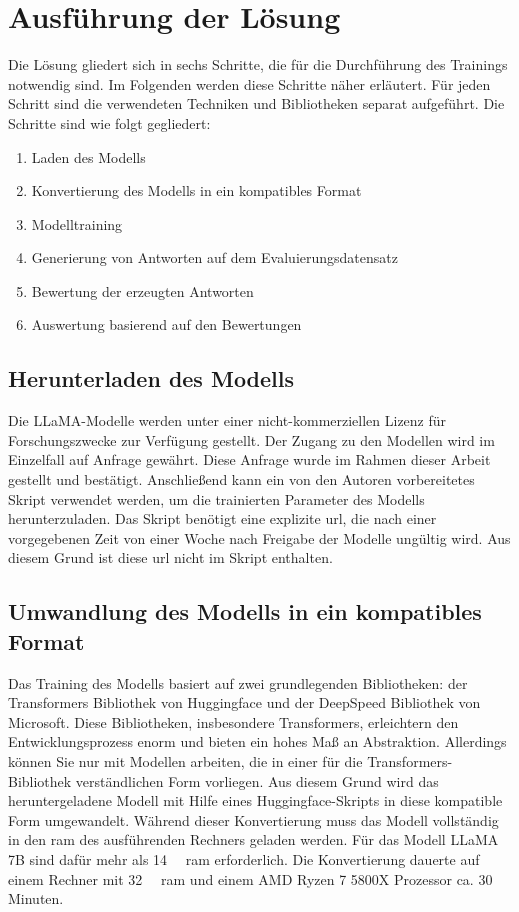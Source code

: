 \chapter{Ausführung der Lösung}\label{ch:solution}

Die Lösung gliedert sich in sechs Schritte, die für die Durchführung des Trainings notwendig sind.
Im Folgenden werden diese Schritte näher erläutert. Für jeden Schritt sind die verwendeten Techniken und Bibliotheken separat aufgeführt.
Die Schritte sind wie folgt gegliedert:
\begin{enumerate}
    \item Laden des Modells
    \item Konvertierung des Modells in ein kompatibles Format
    \item Modelltraining
    \item Generierung von Antworten auf dem Evaluierungsdatensatz
    \item Bewertung der erzeugten Antworten
    \item Auswertung basierend auf den Bewertungen
\end{enumerate}

\section{Herunterladen des Modells}
Die LLaMA-Modelle werden unter einer nicht-kommerziellen Lizenz für Forschungszwecke zur Verfügung gestellt. Der Zugang zu den Modellen wird im Einzelfall auf Anfrage gewährt. Diese Anfrage wurde im Rahmen dieser Arbeit gestellt und bestätigt.
Anschließend kann ein von den Autoren vorbereitetes Skript verwendet werden, um die trainierten Parameter des Modells herunterzuladen.
Das Skript benötigt eine explizite \ac{url}, die nach einer vorgegebenen Zeit von einer Woche nach Freigabe der Modelle ungültig wird. Aus diesem Grund ist diese \ac{url} nicht im Skript enthalten.

\section{Umwandlung des Modells in ein kompatibles Format}
Das Training des Modells basiert auf zwei grundlegenden Bibliotheken: der Transformers Bibliothek von Huggingface und der DeepSpeed Bibliothek von Microsoft.
Diese Bibliotheken, insbesondere Transformers, erleichtern den Entwicklungsprozess enorm und bieten ein hohes Maß an Abstraktion. Allerdings können Sie nur mit Modellen arbeiten, die in einer für die Transformers-Bibliothek verständlichen Form vorliegen.
Aus diesem Grund wird das heruntergeladene Modell mit Hilfe eines Huggingface-Skripts in diese kompatible Form umgewandelt.
Während dieser Konvertierung muss das Modell vollständig in den \ac{ram} des ausführenden Rechners geladen werden. Für das Modell LLaMA 7B sind dafür mehr als \SI{14}{\giga\byte} \ac{ram} erforderlich.
Die Konvertierung dauerte auf einem Rechner mit \SI{32}{\giga\byte} \ac{ram} und einem AMD Ryzen 7 5800X Prozessor ca. 30 Minuten.

